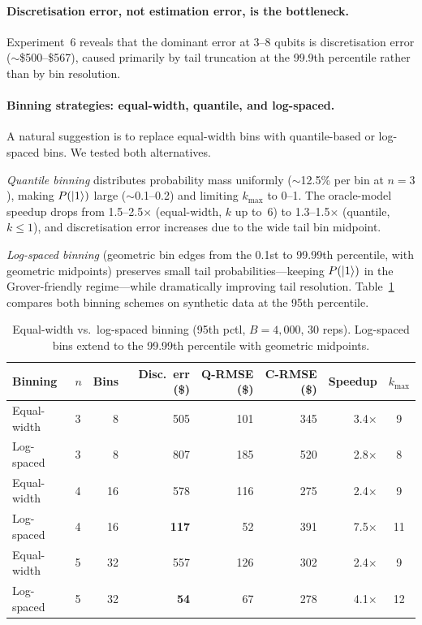 \documentclass[11pt,a4paper]{article}
\begin{document}
\paragraph{Discretisation error, not estimation error, is the bottleneck.} Experiment~6 reveals that the dominant error at 3--8 qubits is discretisation error ($\sim$\$500--\$567), caused primarily by tail truncation at the 99.9th percentile rather than by bin resolution.

\paragraph{Binning strategies: equal-width, quantile, and log-spaced.} A natural suggestion is to replace equal-width bins with quantile-based or log-spaced bins. We tested both alternatives.

\emph{Quantile binning} distributes probability mass uniformly ($\sim$12.5\% per bin at $n=3$), making $P(\ket{1})$ large ($\sim$0.1--0.2) and limiting $k_{\max}$ to 0--1. The oracle-model speedup drops from 1.5--2.5$\times$ (equal-width, $k$ up to~6) to 1.3--1.5$\times$ (quantile, $k \leq 1$), and discretisation error increases due to the wide tail bin midpoint.

\emph{Log-spaced binning} (geometric bin edges from the 0.1st to 99.99th percentile, with geometric midpoints) preserves small tail probabilities---keeping $P(\ket{1})$ in the Grover-friendly regime---while dramatically improving tail resolution. Table~\ref{tab:logspaced} compares both binning schemes on synthetic data at the 95th percentile.

\begin{table}[t]
\centering
\caption{Equal-width vs.\ log-spaced binning (95th pctl, $B = 4{,}000$, 30 reps). Log-spaced bins extend to the 99.99th percentile with geometric midpoints.}
\label{tab:logspaced}
{\small
\begin{tabular}{llrrrrrc}
\toprule
Binning & $n$ & Bins & Disc.\ err (\$) & Q-RMSE (\$) & C-RMSE (\$) & Speedup & $k_{\max}$ \\
\midrule
Equal-width & 3 & 8 & 505 & 101 & 345 & 3.4$\times$ & 9 \\
Log-spaced & 3 & 8 & 807 & 185 & 520 & 2.8$\times$ & 8 \\
Equal-width & 4 & 16 & 578 & 116 & 275 & 2.4$\times$ & 9 \\
Log-spaced & 4 & 16 & \textbf{117} & 52 & 391 & 7.5$\times$ & 11 \\
Equal-width & 5 & 32 & 557 & 126 & 302 & 2.4$\times$ & 9 \\
Log-spaced & 5 & 32 & \textbf{54} & 67 & 278 & 4.1$\times$ & 12 \\
\bottomrule
\end{tabular}
}
\end{table}
\end{document}

